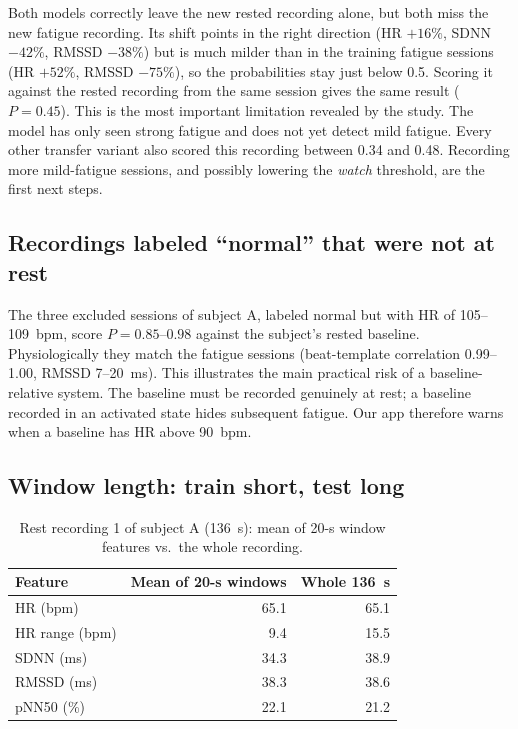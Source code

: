 \documentclass[11pt]{article}
\newcommand{\rowband}{\rowcolors{2}{bblight}{white}}
\begin{document}
Both models correctly leave the new rested recording alone, but both miss the new fatigue recording.
Its shift points in the right direction (HR $+16\%$, SDNN $-42\%$, RMSSD $-38\%$) but is much milder than in the
training fatigue sessions (HR $+52\%$, RMSSD $-75\%$), so the probabilities stay just below 0.5. Scoring it
against the rested recording from the same session gives the same result ($P=0.45$). This is the most
important limitation revealed by the study. The model has only seen strong fatigue and does not yet detect
mild fatigue. Every other transfer variant also scored this recording between 0.34 and 0.48. Recording more mild-fatigue
sessions, and possibly lowering the \emph{watch} threshold, are the first next steps.

\subsection{Recordings labeled ``normal'' that were not at rest}
\label{sec:unrested}
The three excluded sessions of subject A, labeled normal but with HR of 105--109~bpm, score
$P=0.85$--$0.98$ against the subject's rested baseline. Physiologically they match the fatigue sessions
(beat-template correlation 0.99--1.00, RMSSD 7--20~ms). This illustrates the main practical risk of a
baseline-relative system. The baseline must be recorded genuinely at rest; a baseline recorded in an activated state
hides subsequent fatigue. Our app therefore warns when a baseline has HR above 90~bpm.

\subsection{Window length: train short, test long}
\label{sec:window}

\begin{table}[h]
\centering
\caption{Rest recording 1 of subject A (136~s): mean of 20-s window features vs.\ the whole recording.}
\label{tab:window}
\rowband\begin{tabular}{lrr}
\toprule
Feature & Mean of 20-s windows & Whole 136~s \\
\midrule
HR (bpm)       & 65.1 & 65.1 \\
HR range (bpm) & 9.4  & 15.5 \\
SDNN (ms)      & 34.3 & 38.9 \\
RMSSD (ms)     & 38.3 & 38.6 \\
pNN50 (\%)     & 22.1 & 21.2 \\
\bottomrule
\end{tabular}
\end{table}
\end{document}
